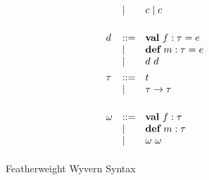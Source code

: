 \begin{figure}
\[\begin{array}{lll}
     & \mathrel{\mid} & c \mathrel{\mid} c\\
	 \\[1ex]
d    & ::= & \textbf{val}~ f:\tau = e \\
     & \mathrel{\mid} & \textbf{def}~ m:\tau = e \\
     & \mathrel{\mid} & d~d
\\[1ex]
\tau & ::= & t\\
     & \mathrel{\mid} & \tau \rightarrow \tau \\
\\[1ex]
\omega   & ::= & \textbf{val}~ f:\tau\\
         & \mathrel{\mid} & \textbf{def}~ m:\tau \\
         & \mathrel{\mid} & \omega~\omega 
\\[1ex]
\end{array}
\]
\caption{Featherweight Wyvern Syntax}
\label{fig:core2-syntax}
\end{figure}


